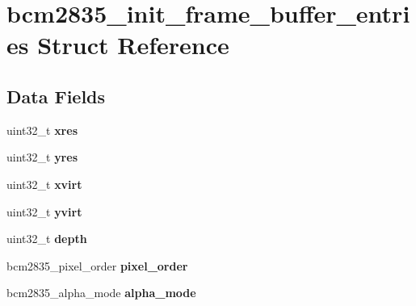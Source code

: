 \hypertarget{structbcm2835__init__frame__buffer__entries}{}\section{bcm2835\+\_\+init\+\_\+frame\+\_\+buffer\+\_\+entries Struct Reference}
\label{structbcm2835__init__frame__buffer__entries}
\subsection*{Data Fields}
\begin{DoxyCompactItemize}
\item 
\mbox{\label{structbcm2835__init__frame__buffer__entries_a16814c75576a59ba65c2c99d6115d4c0}} 
uint32\+\_\+t {\bfseries xres}
\item 
\mbox{\label{structbcm2835__init__frame__buffer__entries_a98605a883d8df52b3411fefdef9621dc}} 
uint32\+\_\+t {\bfseries yres}
\item 
\mbox{\label{structbcm2835__init__frame__buffer__entries_a0d2dcff7edf21ec7edf5288185713af2}} 
uint32\+\_\+t {\bfseries xvirt}
\item 
\mbox{\label{structbcm2835__init__frame__buffer__entries_aa78e04704031a0bb1836fa98e50df54a}} 
uint32\+\_\+t {\bfseries yvirt}
\item 
\mbox{\label{structbcm2835__init__frame__buffer__entries_a52e026e92c74d715d70e7af134331ecf}} 
uint32\+\_\+t {\bfseries depth}
\item 
\mbox{\label{structbcm2835__init__frame__buffer__entries_a64bf7d8fcd12b4229450481c2dbd1262}} 
bcm2835\+\_\+pixel\+\_\+order {\bfseries pixel\+\_\+order}
\item 
\mbox{\label{structbcm2835__init__frame__buffer__entries_af67195e21ccf50e2faccbcc76f697a63}} 
bcm2835\+\_\+alpha\+\_\+mode {\bfseries alpha\+\_\+mode}
\item 

\end{DoxyCompactItemize}
